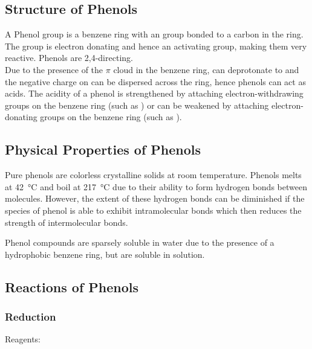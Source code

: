 \documentclass[../main]{subfiles}
\begin{document}
	\subsection{Structure of Phenols}

	A Phenol group is a benzene ring with an  group bonded to a carbon in the ring. \\

	The  group is electron donating and hence an activating group, making them very reactive. Phenols are 2,4-directing. \\

	Due to the presence of the \(\pi\)  cloud in the benzene ring,  can deprotonate to  and the negative charge on  can be dispersed across the ring, hence phenols can act as acids. The acidity of a phenol is strengthened by attaching electron-withdrawing groups on the benzene ring (such as ) or can be weakened by attaching electron-donating groups on the benzene ring (such as ).

	\subsection{Physical Properties of Phenols}

	Pure phenols are colorless crystalline solids at room temperature. Phenols melts at \SI{42}{\celsius} and boil at \SI{217}{\celsius} due to their ability to form hydrogen bonds between molecules. However, the extent of these hydrogen bonds can be diminished if the species of phenol is able to exhibit intramolecular  bonds which then reduces the strength of intermolecular bonds.

	Phenol compounds are sparsely soluble in water due to the presence of a hydrophobic benzene ring, but are soluble in  solution. \\

	\subsection{Reactions of Phenols}

	\subsubsection{Reduction}

	Reagents:  \\

\end{document}
